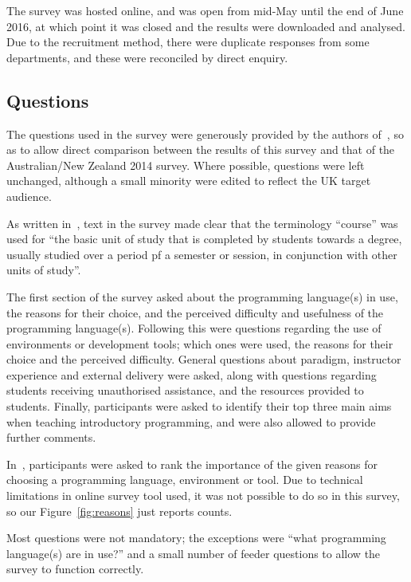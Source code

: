\documentclass{sig-alternate}
\begin{document}
The survey was hosted online, and was open from mid-May until the end of June 2016, at which point it was closed and the results were downloaded and analysed. Due to the recruitment method, there were duplicate responses from some departments, and these were reconciled by direct enquiry.
\subsection{Questions}

The questions used in the survey were generously provided by the authors of~\cite{mason+cooper:2014}, so as to allow direct comparison between the results of this survey and that of the Australian/New Zealand 2014 survey. Where possible, questions were left unchanged, although a small minority were edited to reflect the UK target audience. 

As written in~\cite{mason+cooper:2014}, text in the survey made clear that the terminology ``course'' was used for ``the basic unit of study that is completed by students towards a degree, usually studied over a period pf a semester or session, in conjunction with other units of study''. 

The first section of the survey asked about the programming language(s) in use, the reasons for their choice, and the perceived difficulty and usefulness of the programming language(s). Following this were questions regarding the use of environments or development tools; which ones were used, the reasons for their choice and the perceived difficulty. General questions about paradigm, instructor experience and external delivery were asked, along with questions regarding students receiving unauthorised assistance, and the resources provided to students. Finally, participants were asked to identify their top three main aims when teaching introductory programming, and were also allowed to provide further comments. 

In~\cite{mason+cooper:2014}, participants were asked to rank the importance of the given reasons for choosing a programming language, environment or tool. Due to technical limitations in online survey tool used, it was not possible to do so in this survey, so our Figure~\ref{fig:reasons} just reports counts.

Most questions were not mandatory; the exceptions were ``what programming language(s) are in use?'' and a small number of feeder questions to allow the survey to function correctly.
\end{document}
